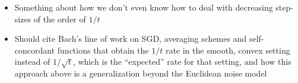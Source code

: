 \documentclass[twoside]{article}
\newcommand*{\expect}[2][]{\ensuremath{\mathbb{E}_{#1} \left[ #2 \right] }} %
\begin{document}
\begin{itemize}
	and so folks focus on $\expect{\norm{\theta_n - \theta_*}^2}$ even if it's somewhat meaningless 
	in the non-asymptotic regime, 
	and the best non-asymptotic results 
	still rely on Taylor expansions after $n > $ something big?
	\item Something about how we don't even know how to deal with decreasing step-sizes 
	of the order of $1/t$ 
	\item 
	Should cite Bach's line of work on SGD, averaging schemes and self-concordant functions 
	that obtain the $1/t$ rate in the smooth, convex setting instead of $1/\sqrt{t}$, 
	which is the ``expected'' rate for that setting, 
	and how this approach above is a generalization beyond the Euclidean noise model 


\end{itemize}
\end{document}
